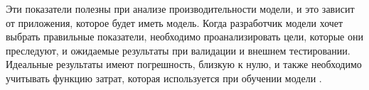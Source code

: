 Эти показатели полезны при анализе производительности модели, и это зависит от приложения, которое будет иметь модель. Когда разработчик модели хочет выбрать правильные показатели, необходимо проанализировать цели, которые они преследуют, и ожидаемые результаты при валидации и внешнем тестировании. Идеальные результаты имеют погрешность, близкую к нулю, и также необходимо учитывать функцию затрат, которая используется при обучении модели \cite{bengio2017deep}.









